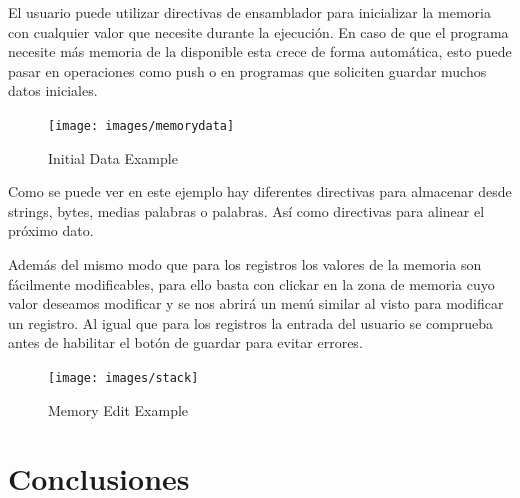 {{            El usuario puede utilizar directivas de ensamblador para inicializar la memoria
            con cualquier valor que necesite durante la ejecución. En caso de que el programa necesite más memoria de la disponible esta crece de forma automática, esto puede pasar
            en operaciones como push o en programas que soliciten guardar muchos datos iniciales.

            \begin{figure}[h]
                \centering
                \texttt{[image: images/memorydata]}
                \caption{Initial Data Example}
            \end{figure}
            Como se puede ver en este ejemplo hay diferentes directivas para almacenar desde strings, bytes, medias palabras
            o palabras. Así como directivas para alinear el próximo dato.

            Además del mismo modo que para los registros los valores de la memoria son fácilmente modificables,
            para ello basta con clickar en la zona de memoria cuyo valor deseamos modificar y se nos abrirá un menú similar al visto
            para modificar un registro. Al igual que para los registros la entrada del usuario se comprueba antes de habilitar el botón de guardar para evitar errores.



            \begin{figure}[h]
                \centering
                \texttt{[image: images/stack]}
                \caption{Memory Edit Example}
            \end{figure}
        }
    }

\section{Conclusiones}
{
}

\newpage
